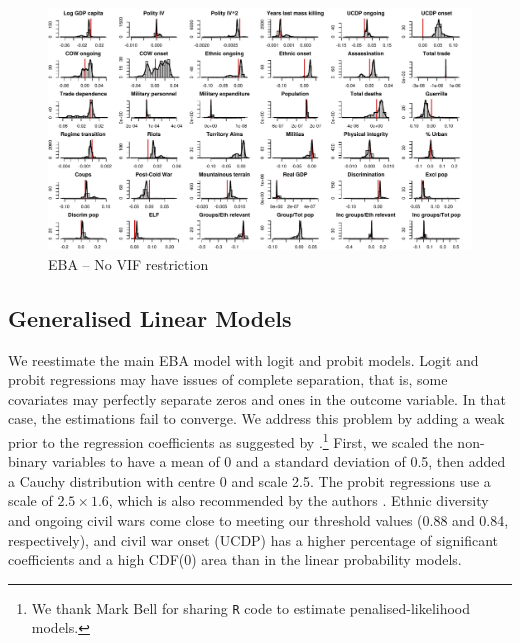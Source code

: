 \documentclass[a4paper,12pt]{article}
\begin{document}
\begin{figure}
    \centering
    \includegraphics[width=.98\textheight,angle=90]{images/mk-no-vif.pdf}
    \caption{EBA -- No VIF restriction}
    \label{fig:mk-no-vif}
\end{figure}

\subsection{Generalised Linear Models}

We reestimate the main EBA model with logit and probit models. Logit and probit regressions may have issues of complete separation, that is, some covariates may perfectly separate zeros and ones in the outcome variable. In that case, the estimations fail to converge. We address this problem by adding a weak prior to the regression coefficients as suggested by \citet{gelman2008weakly}.\footnote{We thank Mark Bell for sharing \texttt{R} code to estimate penalised-likelihood models.} First, we scaled the non-binary variables to have a mean of 0 and a standard deviation of 0.5, then added a Cauchy distribution with centre 0 and scale 2.5. The probit regressions use a scale of $2.5 \times 1.6$, which is also recommended by the authors \citep{arm2017rpackage}. Ethnic diversity and ongoing civil wars come close to meeting our threshold values (0.88 and 0.84, respectively), and civil war onset (UCDP) has a higher percentage of significant coefficients and a high CDF(0) area than in the linear probability models.

\vspace{1cm}
\end{document}
